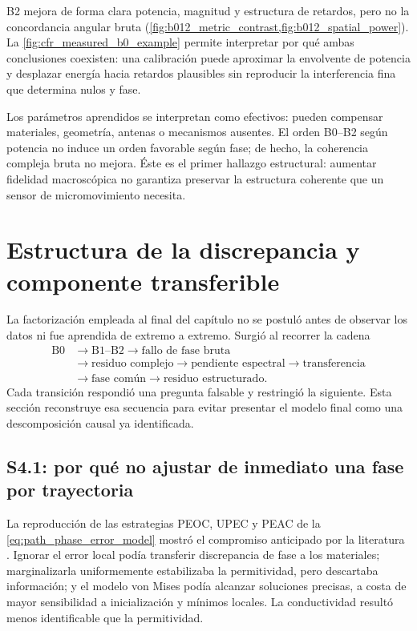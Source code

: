 B2 mejora de forma clara potencia, magnitud y estructura de retardos, pero no la
concordancia angular bruta (\cref{fig:b012_metric_contrast,fig:b012_spatial_power}).
La \cref{fig:cfr_measured_b0_example} permite interpretar por qué ambas conclusiones
coexisten: una calibración puede aproximar la envolvente de potencia y desplazar
energía hacia retardos plausibles sin reproducir la interferencia fina que determina
nulos y fase.

Los parámetros aprendidos se interpretan como efectivos: pueden compensar materiales,
geometría, antenas o mecanismos ausentes. El orden B0--B2 según potencia no induce
un orden favorable según fase; de hecho, la coherencia compleja bruta no mejora.
Éste es el primer hallazgo estructural: aumentar fidelidad macroscópica no garantiza
preservar la estructura coherente que un sensor de micromovimiento necesita.

\section{Estructura de la discrepancia y componente transferible}

La factorización empleada al final del capítulo no se postuló antes de observar los
datos ni fue aprendida de extremo a extremo. Surgió al recorrer la cadena
\begin{equation}
\begin{aligned}
\text{B0}&\longrightarrow\text{B1--B2}
\longrightarrow\text{fallo de fase bruta}\\
&\longrightarrow\text{residuo complejo}
\longrightarrow\text{pendiente espectral}
\longrightarrow\text{transferencia}
\\
&\longrightarrow\text{fase común}
\longrightarrow\text{residuo estructurado}.
\end{aligned}
\label{eq:phase_factorization_history}
\end{equation}
Cada transición respondió una pregunta falsable y restringió la siguiente. Esta
sección reconstruye esa secuencia para evitar presentar el modelo final como una
descomposición causal ya identificada.

\subsection{S4.1: por qué no ajustar de inmediato una fase por trayectoria}

La reproducción de las estrategias PEOC, UPEC y PEAC de la
\cref{eq:path_phase_error_model} mostró el compromiso anticipado por la literatura
\citep{Ruah2024Phase}. Ignorar el error local podía transferir discrepancia de fase
a los materiales; marginalizarla uniformemente estabilizaba la permitividad, pero
descartaba información; y el modelo von Mises podía alcanzar soluciones precisas,
a costa de mayor sensibilidad a inicialización y mínimos locales. La conductividad
resultó menos identificable que la permitividad.

